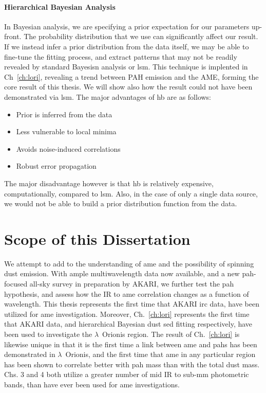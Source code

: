         \paragraph{Hierarchical Bayesian Analysis}
        In Bayesian analysis, we are specifying a prior expectation for our parameters up-front. The probability distribution that we use can significantly affect our result. If we instead infer a prior distribution from the data itself, we may be able to fine-tune the fitting process, and extract patterns that may not be readily revealed by standard Bayesisn analysis or \acrshort{lsm}. This technique is implented in Ch~\ref{ch:lori}, revealing a trend between PAH emission and the AME, forming the core result of this thesis. We will show also how the result could not have been demonstrated via \acrshort{lsm}. The major advantages of \acrshort{hb} are as follows:
            \begin{itemize}
                \item Prior is inferred from the data
                \item Less vulnerable to local minima
                \item Avoids noise-induced correlations
                \item Robust error propagation
            \end{itemize}
        The major disadvantage however is that \acrshort{hb} is relatively expensive, computationally, compared to \acrshort{lsm}. Also, in the case of only a single data source, we would not be able to build a prior distribution function from the data.

\section{Scope of this Dissertation}
    We attempt to add to the understanding of \acrshort{ame} and the possibility of spinning dust emission. With ample multiwavelength data now available, and a new \acrshort{pah}-focused all-sky survey in preparation by AKARI, we further test the \acrshort{pah} hypothesis, and assess how the IR to \acrshort{ame} correlation changes as a function of wavelength. This thesis represents the first time that AKARI \acrshort{irc} data, have been utilized for \acrshort{ame} investigation. Moreover, Ch.~\ref{ch:lori} represents the first time that AKARI data, and hierarchical Bayesian dust \acrshort{sed} fitting respectively, have been used to investigate the $\lambda$~Orionis region. The result of Ch.~\ref{ch:lori} is likewise unique in that it is the first time a link between \acrshort{ame} and \acrshort{pah}s has been demonstrated in $\lambda$~Orionis, and the first time that \acrshort{ame} in any particular region has been shown to correlate better with \acrshort{pah} mass than with the total dust mass. Chs. 3 and 4 both utilize a greater number of mid IR to sub-mm photometric bands, than have ever been used for \acrshort{ame} investigations.

